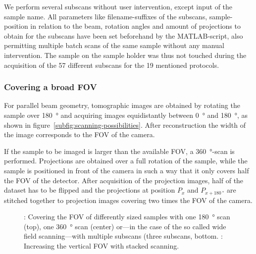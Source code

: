 We perform several subscans without user intervention, except input of the sample name. All parameters like filename-suffixes of the subscans, sample-position in relation to the beam, rotation angles and amount of projections to obtain for the subscans have been set beforehand by the MATLAB-script, also permitting multiple batch scans of the same sample without any manual intervention. The sample on the sample holder was thus not touched during the acquisition of the 57 different subscans for the 19 mentioned protocols. 

\subsubsection{Covering a broad FOV}
\label{subsec:covering a broad fov}
For parallel beam geometry, tomographic images are obtained by rotating the sample over \SI{180}{\degree} and acquiring images equidistantly between \SI{0}{\degree} and \SI{180}{\degree}, as shown in figure~\ref{subfig:scanning-possibilities}. After reconstruction the width of the image corresponds to the FOV of the camera.

If the sample to be imaged is larger than the available FOV, a \SI{360}{\degree}-scan is performed. Projections are obtained over a full rotation of the sample, while the sample is positioned in front of the camera in such a way that it only covers half the FOV of the detector. After acquisition of the projection images, half of the dataset has to be flipped and the projections at position $P_{x}$ and $P_{x+\SI{180}{\degree}}$ are stitched together to projection images covering two times the FOV of the camera.

\begin{figure*}
	\noindent{}%
	\caption[Covering the FOV of differently sized samples]{: Covering the FOV of differently sized samples with one \SI{180}{\degree} scan (top), one \SI{360}{\degree} scan (center) or---in the case of the so called wide field scanning---with multiple subscans (three subscans, bottom. : Increasing the vertical FOV with stacked scanning.
	}%
	\label{fig:scanning-possibilities}%
\end{figure*}

